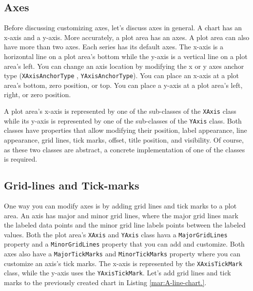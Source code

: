 \documentclass[american]{tufte-book}
\numberwithin{equation}{section}
\numberwithin{figure}{section}
\begin{document}
{\subsection{Axes}

Before discussing customizing axes, let’s discuss axes in general.
A chart has an x-axis and a y-axis. More accurately, a plot area has
an axes. A plot area can also have more than two axes. Each series
has its default axes. The x-axis is a horizontal line on a plot area's
bottom while the y-axis is a vertical line on a plot area's left.
You can change an axis location by modifying the x or y axes anchor
type (\texttt{XAxisAnchorType} , \texttt{YAxisAnchorType}). You can
place an x-axis at a plot area's bottom, zero position, or top. You
can place a y-axis at a plot area's left, right, or zero position. 

A plot area's x-axis is represented by one of the sub-classes of the
\texttt{XAxis} class while its y-axis is represented by one of the
sub-classes of the \texttt{YAxis} class. Both classes have properties
that allow modifying their position, label appearance, line appearance,
grid lines, tick marks, offset, title position, and visibility. Of
course, as these two classes are abstract, a concrete implementation
of one of the classes is required.

\subsection{Grid-lines and Tick-marks}

One way you can modify axes is by adding grid lines and tick marks
to a plot area. An axis has major and minor grid lines, where the
major grid lines mark the labeled data points and the minor grid line
labels points between the labeled values. Both the plot area's \texttt{XAxis}
and \texttt{YAxis} class hava a \texttt{MajorGridLines} property and
a \texttt{MinorGridLines} property that you can add and customize.
Both axes also have a \texttt{MajorTickMarks} and \texttt{MinorTickMarks}
property where you can customize an axis's tick marks. The x-axis
is represented by the \texttt{XAxisTickMark} class, while the y-axis
uses the \texttt{YAxisTickMark}. Let's add grid lines and tick marks
to the previously created chart in Listing \ref{mar:A-line-chart.}.

}
\end{document}
